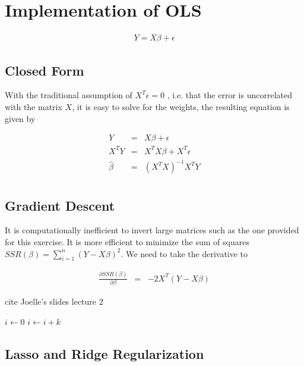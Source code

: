 \documentclass[conference]{IEEEtran}
\begin{document}
\section{Implementation of OLS}

\begin{eqnarray}
  Y = X \beta + \epsilon
\end{eqnarray}

\subsection{Closed Form}

With the traditional assumption of $X^T \epsilon = 0$
\cite{davidson2004econometrics}, i.e. that the error is 
uncorrelated with the matrix $X$, it is easy to solve for the weights, the
resulting equation is given by

\begin{eqnarray}
  Y &=& X \beta + \epsilon \\
  X^T Y &=& X^T X \beta + X^T \epsilon \\
  \hat{\beta} &=& (X^TX)^{-1}X^TY \\
\end{eqnarray}


\subsection{Gradient Descent}

It is computationally inefficient to invert large matrices such as the one
provided for this exercise. It is more efficient to minimize the sum of squares
$SSR(\beta) = \sum_{i=1}^n (Y-X \beta)^2$. We need to take the derivative to 

\begin{eqnarray}
  \frac{\partial SSR(\beta)}{\partial \beta} &=& -2 X^T (Y-X \beta)
\end{eqnarray}

cite Joelle's slides lecture 2

\begin{algorithmic}
    \State $i\gets 0$
\Else
        \State $i\gets i+k$
    \EndIf
\EndIf
\end{algorithmic}

\subsection{Lasso and Ridge Regularization}
\end{document}

